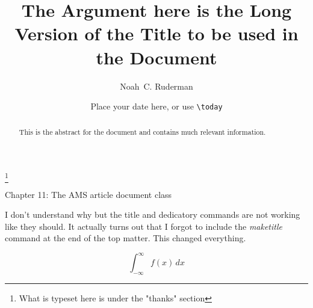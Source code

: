 \documentclass[12pt, intlimits]{amsart} %
\begin{document}
\title[This is the short Title]{The Argument here is the Long Version of the Title to be used in the Document}
\date{Place your date here, or use \texttt{\textbackslash today}} 
\author[N.\, C. Ruderman]{Noah~C. Ruderman}
\address{Place your address here}
\thanks{What is typeset here is under the "thanks" section}

\begin{abstract}
This is the abstract for the document and contains much relevant information.
\end{abstract}



\maketitle %

Chapter 11: The AMS article document class

\bigskip

I don't understand why but the title and dedicatory commands are not working like they should. It actually turns out that I forgot to include the \emph{maketitle} command at the end of the top matter. This changed everything. 

\[
\int^{\infty}_{-\infty} f(x) \, dx
\]
\end{document}
